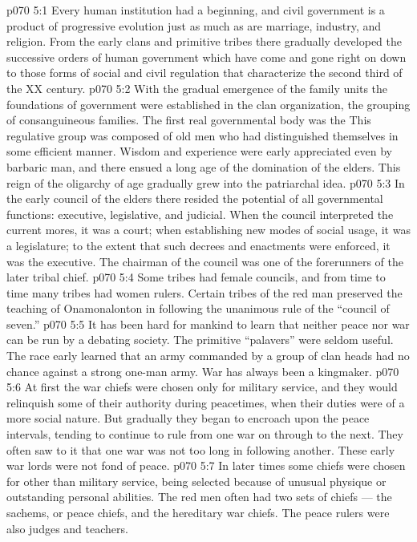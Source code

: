 \vs p070 5:1 Every human institution had a beginning, and civil government is a product of progressive evolution just as much as are marriage, industry, and religion. From the early clans and primitive tribes there gradually developed the successive orders of human government which have come and gone right on down to those forms of social and civil regulation that characterize the second third of the XX century.
\vs p070 5:2 With the gradual emergence of the family units the foundations of government were established in the clan organization, the grouping of consanguineous families. The first real governmental body was the  This regulative group was composed of old men who had distinguished themselves in some efficient manner. Wisdom and experience were early appreciated even by barbaric man, and there ensued a long age of the domination of the elders. This reign of the oligarchy of age gradually grew into the patriarchal idea.
\vs p070 5:3 In the early council of the elders there resided the potential of all governmental functions: executive, legislative, and judicial. When the council interpreted the current mores, it was a court; when establishing new modes of social usage, it was a legislature; to the extent that such decrees and enactments were enforced, it was the executive. The chairman of the council was one of the forerunners of the later tribal chief.
\vs p070 5:4 Some tribes had female councils, and from time to time many tribes had women rulers. Certain tribes of the red man preserved the teaching of Onamonalonton in following the unanimous rule of the “council of seven.”
\vs p070 5:5 \pc It has been hard for mankind to learn that neither peace nor war can be run by a debating society. The primitive “palavers” were seldom useful. The race early learned that an army commanded by a group of clan heads had no chance against a strong one\hyp{}man army. War has always been a kingmaker.
\vs p070 5:6 \pc At first the war chiefs were chosen only for military service, and they would relinquish some of their authority during peacetimes, when their duties were of a more social nature. But gradually they began to encroach upon the peace intervals, tending to continue to rule from one war on through to the next. They often saw to it that one war was not too long in following another. These early war lords were not fond of peace.
\vs p070 5:7 In later times some chiefs were chosen for other than military service, being selected because of unusual physique or outstanding personal abilities. The red men often had two sets of chiefs --- the sachems, or peace chiefs, and the hereditary war chiefs. The peace rulers were also judges and teachers.
